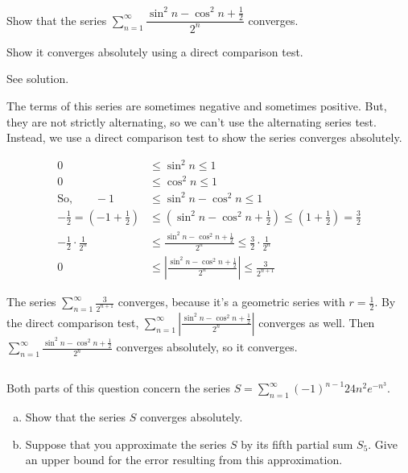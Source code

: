 \begin{question}\label{nonalt2}
Show that the series
$\displaystyle\sum_{n=1}^\infty\dfrac{\sin^2 n - \cos^2 n+\tfrac12}{2^n}$ converges.
\end{question}
\begin{hint}
Show it converges absolutely using a direct comparison test.
\end{hint}
\begin{answer}
See solution.
\end{answer}
\begin{solution}
The terms of this series are sometimes negative and sometimes positive. But, they are not strictly alternating, so we can't use the alternating series test. Instead, we use a direct comparison test to show the series converges absolutely.

\begin{align*}
0&\leq \sin^2 n \le 1\\
0&\leq \cos^2 n \le 1\\
\text{So,}\qquad -1&\leq \sin^2 n - \cos^2 n \le 1\\
-\frac12=\left(-1+\frac12\right)&\leq \left(\sin^2 n - \cos^2 n+\frac12\right) \le \left(1+\frac12\right)=\frac32\\
-\frac{1}{2}\cdot \frac{ 1}{2^n}&\leq \frac{\sin^2 n - \cos^2 n+\tfrac12}{2^n} \le \frac{3}{2}\cdot\frac{1}{2^n}\\
0&\leq \left|\frac{\sin^2 n - \cos^2 n+\tfrac12}{2^n}\right| \le \frac{3}{2^{n+1}}
\end{align*}

The series $\displaystyle\sum_{n=1}^\infty \frac{3}{2^{n+1}}$ converges, because it's a geometric series with $r=\frac{1}{2}$. By the direct comparison test,
$\displaystyle\sum_{n=1}^\infty \left|\frac{\sin^2 n - \cos^2 n+\tfrac12}{2^n}\right| $ converges as well. Then $\displaystyle\sum_{n=1}^\infty \frac{\sin^2 n - \cos^2 n+\tfrac12}{2^n}$ converges absolutely, so it converges.

\end{solution}



\subsection*{\Application}

\begin{question}[2016A]
Both parts of this question concern the series $\displaystyle S = \sum_{n=1}^\infty (-1)^{n-1}24n^2 e^{-n^3}$.
\begin{enumerate}[(a)]
\item
Show that the series $S$ converges absolutely.
\item
Suppose that you approximate the series $S$ by its fifth partial sum $S_5$. Give an upper bound for the error resulting from this approximation.
\end{enumerate}
\end{question}

